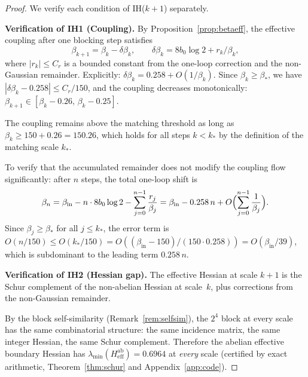\documentclass[11pt]{article}
\theoremstyle{definition}
\begin{document}
\begin{proof}
We verify each condition of IH($k+1$) separately.

\medskip\noindent\textbf{Verification of IH1 (Coupling).}
By Proposition~\ref{prop:betaeff}, the effective coupling after one
blocking step satisfies
\begin{equation}
\beta_{k+1}=\beta_k-\delta\beta_k,\qquad
\delta\beta_k=8b_0\log 2+r_k/\beta_k,
\end{equation}
where $|r_k|\le C_r$ is a bounded constant from the one-loop
correction and the non-Gaussian remainder.  Explicitly:
$\delta\beta_k=0.258+O(1/\beta_k)$.  Since $\beta_k\ge\beta_*$, we have
$|\delta\beta_k-0.258|\le C_r/150$, and the coupling decreases
monotonically: $\beta_{k+1}\in[\beta_k-0.26,\,\beta_k-0.25]$.

The coupling remains above the matching threshold as long as
$\beta_k\ge 150+0.26=150.26$, which holds for all steps $k<k_*$ by
the definition of the matching scale $k_*$.

To verify that the accumulated remainder does not modify the coupling
flow significantly: after $n$ steps, the total one-loop shift is
\begin{equation}
\beta_n=\beta_{\mathrm{in}}-n\cdot 8b_0\log 2
-\sum_{j=0}^{n-1}\frac{r_j}{\beta_j}
=\beta_{\mathrm{in}}-0.258\,n+O\Bigl(\sum_{j=0}^{n-1}\frac{1}{\beta_j}\Bigr).
\end{equation}
Since $\beta_j\ge\beta_*$ for all $j\le k_*$, the error term is
$O(n/150)\le O(k_*/150)=O((\beta_{\mathrm{in}}-150)/(150\cdot 0.258))
=O(\beta_{\mathrm{in}}/39)$, which is subdominant to the leading term $0.258\,n$.

\medskip\noindent\textbf{Verification of IH2 (Hessian gap).}
The effective Hessian at scale $k+1$ is the Schur complement of the
non-abelian Hessian at scale~$k$, plus corrections from the
non-Gaussian remainder.

By the block self-similarity (Remark~\ref{rem:selfsim}), the
$2^4$ block at every scale has the same combinatorial structure:
the same incidence matrix, the same integer Hessian, the same
Schur complement.  Therefore the abelian effective boundary
Hessian has $\lambda_{\min}(H_{\mathrm{eff}}^{\mathrm{ab}})=0.6964$
at \emph{every} scale (certified by exact arithmetic,
Theorem~\ref{thm:schur} and Appendix~\ref{app:code}).


\end{proof}
\end{document}
